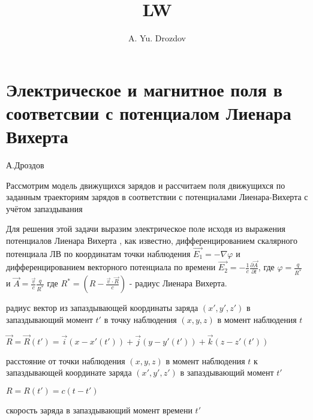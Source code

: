 \documentclass[11pt]{article}
\author{A. Yu. Drozdov}
\title{LW}
\begin{document}
    
    \maketitle
    
    

    
    \section{Электрическое и магнитное поля в соответсвии с потенциалом
Лиенара
Вихерта}\label{ux44dux43bux435ux43aux442ux440ux438ux447ux435ux441ux43aux43eux435-ux438-ux43cux430ux433ux43dux438ux442ux43dux43eux435-ux43fux43eux43bux44f-ux432-ux441ux43eux43eux442ux432ux435ux442ux441ux432ux438ux438-ux441-ux43fux43eux442ux435ux43dux446ux438ux430ux43bux43eux43c-ux43bux438ux435ux43dux430ux440ux430-ux432ux438ux445ux435ux440ux442ux430}

    А.Дроздов

    Рассмотрим модель движущихся зарядов и рассчитаем поля движущихся по
заданным траекториям зарядов в соответствии с потенциалами
Лиенара-Вихерта с учётом запаздывания

    Для решения этой задачи выразим электрическое поле исходя из выражения
потенциалов Лиенара Вихерта \cite{LL2}, как известно, дифференцированием
скалярного потенциала ЛВ по координатам точки наблюдения
\(\overrightarrow{E_1} = - \nabla\varphi\) и дифференцированием
векторного потенциала по времени
\(\overrightarrow{E_2}=-\frac{1}{c}\frac{\partial \overrightarrow{A}}{\partial t}\),
где \(\varphi=\frac{q}{{{R}^{*}}}\) и
\(\overrightarrow{A}=\frac{\overrightarrow{v}}{c}\frac{q}{{{R}^{*}}}\)
где
\({{R}^{*}}=\left( R-\frac{\overrightarrow{v}\cdot \overrightarrow{R}}{c} \right)\)
- радиус Лиенара Вихерта.

    радиус вектор из запаздывающей координаты заряда \((x', y', z')\) в
запаздывающий момент \(t'\) в точку наблюдения \((x, y, z)\) в момент
наблюдения \(t\)

\(\vec R = \vec R\left(t'\right)  = \vec i \left(x-x'\left(t'\right)\right)  + \vec j \left(y-y'\left(t'\right)\right)  + \vec k \left(z-z'\left(t'\right)\right)\)

расстояние от точки наблюдения \((x, y, z)\) в момент наблюдения \(t\) к
запаздывающей координате заряда \((x', y', z')\) в запаздывающий момент
\(t'\)

\(R = R\left(t'\right) = c \left(t-t'\right)\)

скорость заряда в запаздывающий момент времени \(t'\)
\end{document}
